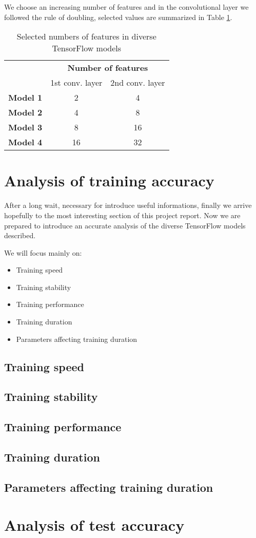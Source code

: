 We choose an increasing number of features and in the convolutional layer we followed the rule of doubling, selected values are summarized in Table \ref{tab:features_number}.

\begin{table}
	\caption{Selected numbers of features in diverse TensorFlow models}
	\label{tab:features_number}
	\centering
	\begin{tabular}{ccc}
		\hline 
		& \multicolumn{2}{c}{\textbf{Number of features}} \\ 
		& 1st conv. layer & 2nd conv. layer \\ 
		\hline 
		\textbf{Model 1} & 2 & 4 \\ 
		\textbf{Model 2} & 4 & 8 \\ 
		\textbf{Model 3} & 8 & 16 \\ 
		\textbf{Model 4} & 16 & 32 \\ 
		\hline 
	\end{tabular}
\end{table}

\section{Analysis of training accuracy}

After a long wait, necessary for introduce useful informations, finally we arrive hopefully to the most interesting section of this project report. Now we are prepared to introduce an accurate analysis of the diverse TensorFlow models described.

We will focus mainly on:
\begin{itemize}
	\item Training speed
	\item Training stability
	\item Training performance
	\item Training duration
	\item Parameters affecting training duration
\end{itemize}

\subsection{Training speed}

\subsection{Training stability}

\subsection{Training performance}

\subsection{Training duration}

\subsection{Parameters affecting training duration}

\section{Analysis of test accuracy}